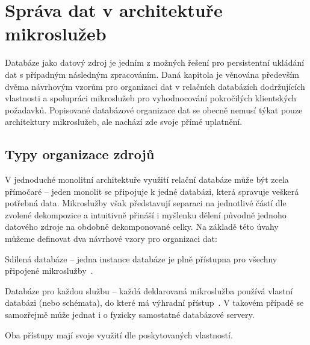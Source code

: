 \chapter{Správa dat v architektuře mikroslužeb}\label{ch:msa-data}


Databáze jako datový zdroj je jedním z možných řešení pro persistentní ukládání dat s případným následným zpracováním.
Daná kapitola je věnována především dvěma návrhovým vzorům pro organizaci dat v relačních databázích dodržujících  vlastnosti a spolupráci mikroslužeb pro vyhodnocování pokročilých klientských požadavků.
Popisované databázové organizace dat se obecně nemusí týkat pouze architektury mikroslužeb, ale nachází zde svoje přímé uplatnění.



\section{Typy organizace zdrojů}\label{sec:msa-db-as-data-source}

V jednoduché monolitní architektuře využití relační databáze může být zcela přímočaré – jeden monolit se připojuje k jedné databázi, která spravuje veškerá potřebná data.
Mikroslužby však představují separaci na jednotlivé částí dle zvolené dekompozice a intuitivně přináší i myšlenku dělení původně jednoho datového zdroje na obdobně dekomponované celky.
Na základě této úvahy můžeme definovat dva návrhové vzory pro organizaci dat:

\begin{dl}
   \item [Sdílená databáze] – jedna instance databáze je plně přístupna pro všechny připojené mikroslužby~\cite{shareddb}.
   \item [Databáze pro každou službu] – každá deklarovaná mikroslužba používá vlastní databázi (nebo schémata), do které má výhradní přístup~\cite{dbperservice}.
   V takovém případě se samozřejmě může jednat i o fyzicky samostatné databázové servery.
\end{dl}

Oba přístupy mají svoje využití dle poskytovaných vlastností.



